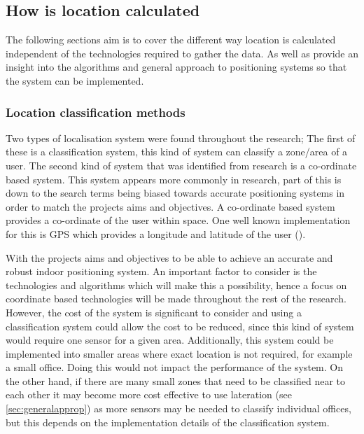 \subsection{How is location calculated}
The following sections aim is to cover the different way location is calculated independent of the technologies required to gather the data. As well as provide an insight into the algorithms and general approach to positioning systems so that the system can be implemented. 

\subsubsection{Location classification methods}
Two types of localisation system were found throughout the research; The first of these is a classification system, this kind of system can classify a zone/area of a user.
The second kind of system that was identified from research is a co-ordinate based system. This system appears more commonly in research, part of this is down to the search terms being biased towards accurate positioning systems in order to match the projects aims and objectives. A co-ordinate based system provides a co-ordinate of the user within space. One well known implementation for this is GPS which provides a longitude and latitude of the user (\cite{kyes_2017_what}).

With the projects aims and objectives to be able to achieve an accurate and robust indoor positioning system. An important factor to consider is the technologies and algorithms which will make this a possibility, hence a focus on coordinate based technologies will be made throughout the rest of the research. However, the cost of the system is significant to consider and using a classification system could allow the cost to be reduced, since this kind of system would require one sensor for a given area. Additionally, this system could be implemented into smaller areas where exact location is not required, for example a small office. Doing this would not impact the performance of the system. On the other hand, if there are many small zones that need to be classified near to each other it may become more cost effective to use lateration (see \ref{sec:generalapprop}) as more sensors may be needed to classify individual offices, but this depends on the implementation details of the classification system.  

